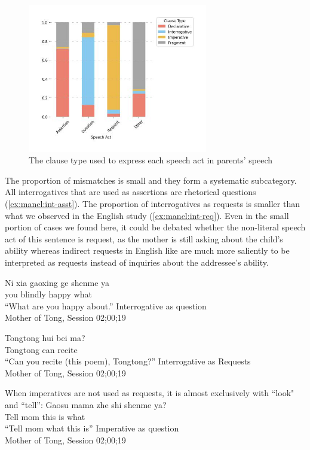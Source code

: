 \begin{figure}[H]
    \centering
    \includegraphics[width=0.7\textwidth]{figures/man-real-spcl.jpg}
    \caption{The clause type used to express each speech act in parents' speech}
    \label{fig:man-real-spcl}
\end{figure}

The proportion of mismatches is small and they form a systematic subcategory. All interrogatives that are used as assertions are rhetorical questions (\ref{ex:mancl:int-asst}). The proportion of interrogatives as requests is smaller than what we observed in the English study (\ref{ex:mancl:int-req}). Even in the small portion of cases we found here, it could be debated whether the non-literal speech act of this sentence is request, as the mother is still asking about the child's ability whereas indirect requests in English like  are much more saliently to be interpreted as requests instead of inquiries about the addressee's ability. 

\gll Ni xia gaoxing ge shenme ya\\
you blindly happy \Cl{} what \Sfp{}\\
``What are you happy about.'' \hfill Interrogative as question \\
Mother of Tong, Session 02;00;19
\eex

\gll Tongtong hui bei ma?\\
Tongtong can recite \\
\trans ``Can you recite (this poem), Tongtong?''
\hfill Interrogative as Requests \\
Mother of Tong, Session 02;00;19
\eex

When imperatives are not used as requests, it is almost exclusively with  ``look" and  ``tell'':
\gll Gaosu mama zhe shi shenme ya?\\
Tell mom this is what \Sfp{}\\
``Tell mom what this is'' \hfill Imperative as question\\
Mother of Tong, Session 02;00;19
\eex

